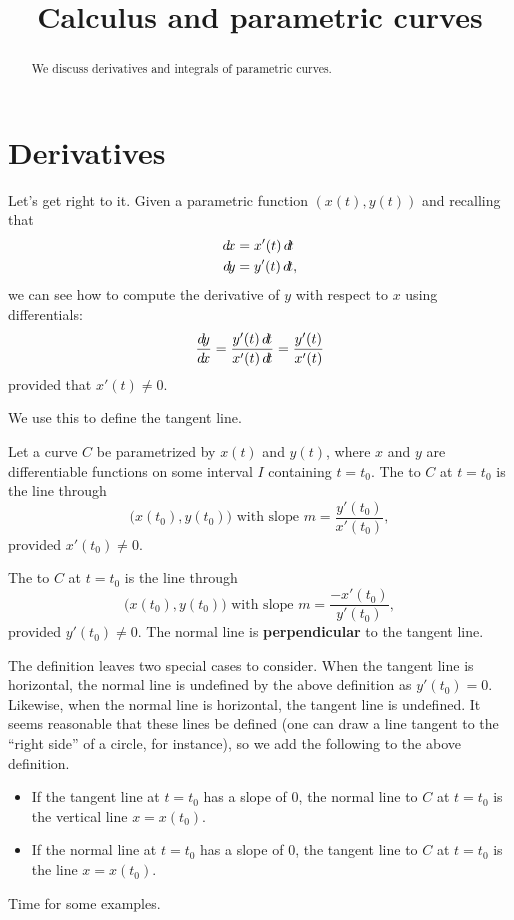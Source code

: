\documentclass{ximera}
\title[Dig-In:]{Calculus and parametric curves}
\begin{document}
\begin{abstract}
  We discuss derivatives and integrals of parametric curves.  
\end{abstract}
\maketitle

\section{Derivatives}

Let's get right to it. Given a parametric function $(x(t),y(t))$ and
recalling that
\begin{align*}
  \d x &= x'(t) \d t\\
  \d y &= y'(t) \d t,
\end{align*}
we can see how to compute the derivative of $y$ with respect to $x$
using differentials:
\[
\frac{\d y}{\d x} = \frac{y'(t) \d t}{x'(t) \d t} = \frac{y'(t)}{x'(t)}
\]
provided that $x'(t) \ne 0$.

We use this to define the tangent line.

\begin{definition}
Let a curve $C$ be parametrized by $x(t)$ and $y(t)$, where $x$ and
$y$ are differentiable functions on some interval $I$ containing
$t=t_0$. The  to $C$ at $t=t_0$ is the line through
\[
\big(x(t_0),y(t_0)\big)\text{ with slope }m=\frac{y'(t_0)}{x'(t_0)},
\]
provided $x'(t_0)\neq 0$.

The  to $C$ at $t=t_0$ is the line through 
\[
\big(x(t_0),y(t_0)\big)\text{ with slope }m=\frac{-x'(t_0)}{y'(t_0)},
\]
provided $y'(t_0)\neq 0$.  The normal line is \textbf{perpendicular}
to the tangent line.
\end{definition}

The definition leaves two special cases to consider. When the tangent
line is horizontal, the normal line is undefined by the above
definition as $y'(t_0)=0$. Likewise, when the normal line is
horizontal, the tangent line is undefined. It seems reasonable that
these lines be defined (one can draw a line tangent to the ``right
side'' of a circle, for instance), so we add the following to the
above definition.

\begin{itemize}
\item If the tangent line at $t=t_0$ has a slope of $0$, the normal
  line to $C$ at $t=t_0$ is the vertical line $x=x(t_0)$.
\item If the normal line at $t=t_0$ has a slope of $0$, the tangent
  line to $C$ at $t=t_0$ is the line $x=x(t_0)$.
\end{itemize}
Time for some examples. 
\end{document}
